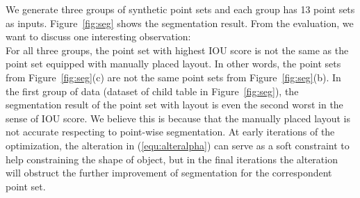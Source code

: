 We generate three groups of synthetic point sets and each group has 13 point sets as inputs. 
Figure~\ref{fig:seg} shows the segmentation result.
From the evaluation, we want to discuss one interesting observation:\\
%
For all three groups, the point set with highest IOU score is not the same as the point set equipped with manually placed layout.
In other words, the point sets from Figure~\ref{fig:seg}(c) are not the same point sets from Figure~\ref{fig:seg}(b). 
In the first group of data (dataset of child table in Figure~\ref{fig:seg}), the segmentation result of the point set with layout is even the second worst in the sense of IOU score. We believe this is because that the manually placed layout is not accurate respecting to point-wise segmentation. 
At early iterations of the optimization, the alteration in (\ref{equ:alteralpha}) can serve as a soft constraint to help constraining the shape of object, but in the final iterations the alteration will obstruct the further improvement of segmentation for the correspondent point set. 
